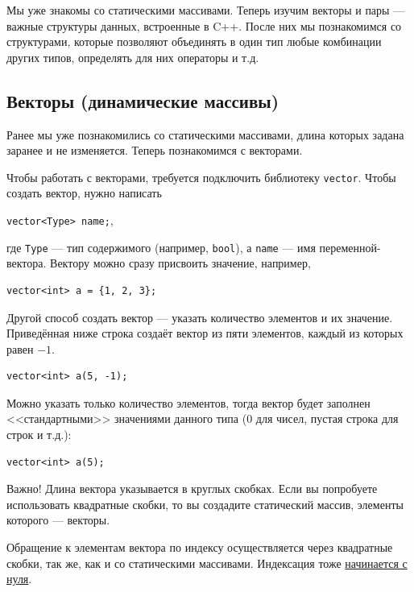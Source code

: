 \documentclass{article}
\newcommand{\important}[1]{
	\begin{sectionenv}[red!30!white]{Важно!}
		#1
	\end{sectionenv}
}
\begin{document}
	Мы уже знакомы со статическими массивами. Теперь изучим векторы и пары --- важные структуры данных, встроенные в C++. После них мы познакомимся со структурами, которые позволяют объединять в один тип любые комбинации других типов, определять для них операторы и т.д.
	
	\subsection{Векторы (динамические массивы)}
	
	Ранее мы уже познакомились со статическими массивами, длина которых задана заранее и не изменяется. Теперь познакомимся с векторами.
	
	Чтобы работать с векторами, требуется подключить библиотеку \texttt{vector}. Чтобы создать вектор, нужно написать
	
	\begin{center}
		\texttt{vector<Type> name;},
	\end{center}
	
	где \texttt{Type} --- тип содержимого (например, \texttt{bool}), а \texttt{name} --- имя переменной-вектора. Вектору можно сразу присвоить значение, например,
	
	\begin{lstlisting}
vector<int> a = {1, 2, 3};
	\end{lstlisting}
	
	Другой способ создать вектор --- указать количество элементов и их значение. Приведённая ниже строка создаёт вектор из пяти элементов, каждый из которых равен $-1$.
	
	\begin{lstlisting}
vector<int> a(5, -1);
	\end{lstlisting}
	
	Можно указать только количество элементов, тогда вектор будет заполнен <<стандартными>> значениями данного типа ($0$ для чисел, пустая строка для строк и т.д.):
	
	\begin{lstlisting}
vector<int> a(5);
	\end{lstlisting}
	
	\important{Длина вектора указывается в круглых скобках. Если вы попробуете использовать квадратные скобки, то вы создадите статический массив, элементы которого --- векторы.}
	
	Обращение к элементам вектора по индексу осуществляется через квадратные скобки, так же, как и со статическими массивами. Индексация тоже \underline{начинается с нуля}.
	
\end{document}
